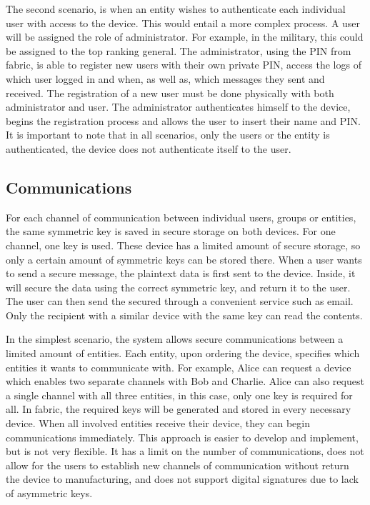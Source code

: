 The second scenario, is when an entity wishes to authenticate each individual user with access to the device. 
This would entail a more complex process. A user will be assigned the role of administrator. For example, in the military, this could be assigned to the top ranking general. The administrator, using the \ac{PIN} from fabric, is able to register new users with their own private \ac{PIN}, access the logs of which user logged in and when, as well as, which messages they sent and received.
The registration of a new user must be done physically with both administrator and user. The administrator authenticates himself to the device, begins the registration process and allows the user to insert their name and \ac{PIN}.
It is important to note that in all scenarios, only the users or the entity is authenticated, the device does not authenticate itself to the user.

\subsection{Communications}\label{chap:problem:scenarios:comms}

For each channel of communication between individual users, groups or entities, the same symmetric key is saved in secure storage on both devices. For one channel, one key is used.
These device has a limited amount of secure storage, so only a certain amount of symmetric keys can be stored there.
When a user wants to send a secure message, the plaintext data is first sent to the device. Inside, it will secure the data using the correct symmetric key, and return it to the user. The user can then send the secured through a convenient service such as email. Only the recipient with a similar device with the same key can read the contents.

In the simplest scenario, the system allows secure communications between a limited amount of entities. Each entity, upon ordering the device, specifies which entities it wants to communicate with. For example, Alice can request a device which enables two separate channels with Bob and Charlie. Alice can also request a single channel with all three entities, in this case, only one key is required for all.
In fabric, the required keys will be generated and stored in every necessary device. When all involved entities receive their device, they can begin communications immediately.
This approach is easier to develop and implement, but is not very flexible. It has a limit on the number of communications, does not allow for the users to establish new channels of communication without return the device to manufacturing, and does not support digital signatures due to lack of asymmetric keys.

